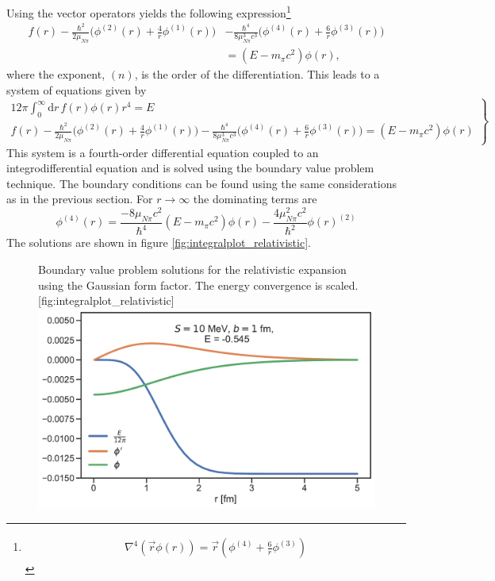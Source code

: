 Using the vector operators yields the following expression\footnote{\begin{align*}
		\nabla^4(\vec{r}\phi(r))=\vec{r}\left(\phi^{(4)}+\frac{6}{r}\phi^{(3)}\right)
\end{align*}}
\begin{equation}\begin{split}
		f(r)-\frac{\hbar^2}{2\mu_{N\pi}}\bigg( \phi^{(2)}(r)+\frac{4}{r}\phi^{(1)}(r) \bigg)&-\frac{\hbar^4}{8\mu_{N\pi}^3 c^3}\bigg(\phi^{(4)}(r)+\frac{6}{r}\phi^{(3)}(r)\bigg) \\
		&=(E-m_\pi c^2)\phi(r),
	\end{split}
\end{equation}
where the exponent, $(n)$, is the order of the differentiation. This leads to a system of equations given by
\begin{equation}\label{systemrel}
	\left.
	\begin{array}{ll}
		12\pi \int_0^\infty  \text{d}r \, f(r) \phi(r) r^4  = E \\
		f(r)-\frac{\hbar^2}{2\mu_{N\pi}}\big( \phi^{(2)}(r)+\frac{4}{r}\phi^{(1)}(r) \big)-\frac{\hbar^4}{8\mu_{N\pi}^3 c^3}\big(\phi^{(4)}(r)+\frac{6}{r}\phi^{(3)}(r)\big)=(E-m_\pi c^2)\phi(r)
	\end{array}
	\right \} 
\end{equation}
This system is a fourth-order differential equation coupled to an integrodifferential equation and is solved using the boundary value problem technique. The boundary conditions can be found using the same considerations as in the previous section. For $r\rightarrow \infty$ the dominating terms are 
\begin{equation}
	\phi^{(4)}(r) = \frac{-8\mu_{N\pi}c^2}{\hbar^4}(E-m_\pi c^2)\phi(r)-\frac{4\mu^2_{N\pi}c^2}{\hbar^2}\phi(r)^{(2)}
\end{equation}
The solutions are shown in figure \ref{fig:integralplot_relativistic}.
\begin{figure}[H]
	\begin{sidecaption}{Boundary value problem solutions for the relativistic expansion using the Gaussian form factor. The energy convergence is scaled.}[fig:integralplot_relativistic]
		\includegraphics[width=\linewidth]{Figures/Integralplot_relativistic.pdf}
	\end{sidecaption}
\end{figure}
